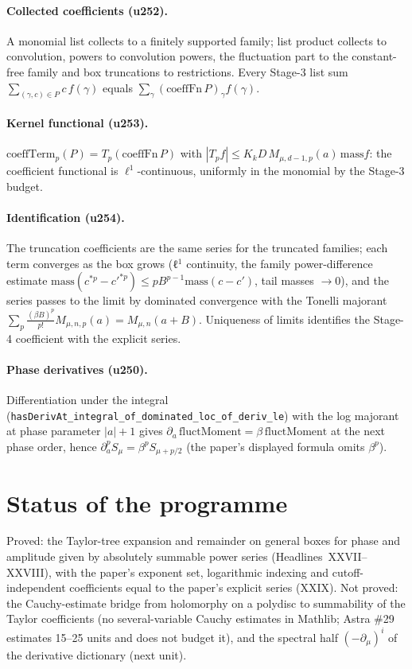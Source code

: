 \documentclass[11pt]{article}
\begin{document}
\paragraph{Collected coefficients (u252).} A monomial list collects to a finitely supported family;
list product collects to convolution, powers to convolution powers, the fluctuation part to the
constant-free family and box truncations to restrictions. Every Stage-3 list sum
$\sum_{(\gamma,c)\in P}c\,f(\gamma)$ equals $\sum_\gamma(\mathrm{coeffFn}\,P)_\gamma f(\gamma)$.
\paragraph{Kernel functional (u253).} $\mathrm{coeffTerm}_p(P)=T_p(\mathrm{coeffFn}\,P)$ with
$|T_p f|\le K_kD\,M_{\mu,d-1,p}(a)\,\mathrm{mass}f$: the coefficient functional is $\ell^1$-continuous,
uniformly in the monomial by the Stage-3 budget.
\paragraph{Identification (u254).} The truncation coefficients are the same series for the truncated
families; each term converges as the box grows (ℓ$^1$ continuity, the family power-difference estimate
$\mathrm{mass}(c^{*p}-c'^{*p})\le pB^{p-1}\mathrm{mass}(c-c')$, tail masses $\to0$), and the series
passes to the limit by dominated convergence with the Tonelli majorant
$\sum_p\frac{(\beta B)^p}{p!}M_{\mu,n,p}(a)=M_{\mu,n}(a+B)$. Uniqueness of limits identifies the
Stage-4 coefficient with the explicit series.
\paragraph{Phase derivatives (u250).} Differentiation under the integral
(\texttt{hasDerivAt\_integral\_of\_dominated\_loc\_of\_deriv\_le}) with the log majorant at phase
parameter $|a|+1$ gives $\partial_a\,\mathrm{fluctMoment}=\beta\,\mathrm{fluctMoment}$ at the next phase
order, hence $\partial_a^pS_\mu=\beta^pS_{\mu+p/2}$ (the paper's displayed formula omits $\beta^p$).

\section{Status of the programme}
Proved: the Taylor-tree expansion and remainder on general boxes for phase and amplitude given by
absolutely summable power series (Headlines~XXVII--XXVIII), with the paper's exponent set, logarithmic
indexing and cutoff-independent coefficients equal to the paper's explicit series (XXIX). Not proved:
the Cauchy-estimate bridge from holomorphy on a polydisc to summability of the Taylor coefficients (no
several-variable Cauchy estimates in Mathlib; Astra \#29 estimates 15--25 units and does not budget it),
and the spectral half $(-\partial_\mu)^i$ of the derivative dictionary (next unit).
\end{document}
